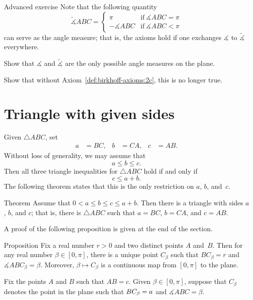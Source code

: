 \begin{thm}{Advanced exercise}\label{ex:angle-measures}
Note that the following quantity 
$$\tilde\measuredangle ABC=
\begin{cases}
\pi&\text{if}\ \measuredangle ABC=\pi
\\
-\measuredangle ABC&\text{if}\ \measuredangle ABC<\pi
\end{cases}
$$
can serve as the angle measure; 
that is, the axioms hold if one exchanges $\measuredangle$ to $\tilde\measuredangle$ everywhere.

Show that $\measuredangle$ and $\tilde\measuredangle$ are the only possible angle measures on the plane. 

Show that without Axiom~\ref{def:birkhoff-axioms:2c}, this is no longer true.
\end{thm}

\section{Triangle with given sides}

Given $\triangle ABC$, set 
\begin{align*}
a&=BC,
&
b&=CA,
&
c&=AB.
\end{align*}
Without loss of generality, we may assume that 
\[a\le b \le c.\]
Then all three triangle inequalities for $\triangle ABC$
hold if and only if 
\[c\le a+b.\]
The following theorem states that this is the only restriction on $a$, $b$, and~$c$.

\begin{thm}[\abs]{Theorem}\label{thm:abc}
Assume that $0<a\le b\le c\le a+b$.
Then there is a triangle with sides $a$, $b$, and $c$;
that is, there is $\triangle ABC$ 
such that $a=BC$, $b=CA$, and $c=AB$.
\end{thm}

A proof of the following proposition is given at the end of the section.

\begin{thm}[\abs]{Proposition}\label{prop:C-cont}
Fix a real number $r>0$ 
and two distinct points $A$ and~$B$.
Then for 
any real number $\beta\in [0,\pi]$,
there is a unique point $C_\beta$ such that $BC_\beta=r$
and $\measuredangle ABC_\beta=\beta$.
Moreover, $\beta\mapsto C_\beta$ 
is a continuous map from $[0,\pi]$ to the plane.
\end{thm}

\label{page:proof:thm:abc}
Fix the points $A$ and $B$ such that $AB=c$.
Given $\beta\in [0,\pi]$,
suppose that $C_\beta$ denotes the point in the plane such that $BC_\beta=a$ and $\measuredangle ABC=\beta$.

